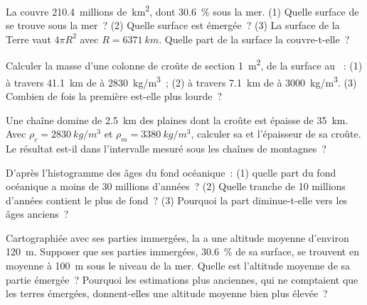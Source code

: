 \begin{exercise}[$\star\star$]\label{exo:g12:continental-crust:6}
La  couvre \num{210.4}~millions de~\unit{km^2}, dont
\qty{30.6}{\percent} sous la mer. (1) Quelle surface de 
se trouve sous la mer~? (2) Quelle surface est émergée~? (3) La surface de
la Terre vaut $4\pi R^2$ avec $R = \qty{6371}{km}$. Quelle part de la
surface la  couvre-t-elle~?
\end{exercise}

\begin{exercise}[$\star\star$]\label{exo:g12:continental-crust:7}
Calculer la masse d'une colonne de croûte de section \qty{1}{m^2}, de la
surface au ~: (1) à travers \qty{41.1}{km} de  à
\qty{2830}{kg/m^3}~; (2) à travers \qty{7.1}{km} de  à
\qty{3000}{kg/m^3}. (3) Combien de fois la première est-elle plus
lourde~?
\end{exercise}

\begin{exercise}[$\star\star$]\label{exo:g12:continental-crust:8}
Une chaîne domine de \qty{2.5}{km} des plaines dont la croûte est épaisse
de \qty{35}{km}. Avec $\rho_c = \qty{2830}{kg/m^3}$ et
$\rho_m =
\qty{3380}{kg/m^3}$, calculer sa  et l'épaisseur de sa
croûte. Le résultat est-il dans l'intervalle mesuré sous les chaînes de
montagnes~?
\end{exercise}

\begin{exercise}[$\star\star$]\label{exo:g12:continental-crust:9}
D'après l'histogramme des âges du fond océanique~: (1) quelle part du fond
océanique a moins de 30 millions d'années~? (2) Quelle tranche de 10
millions d'années contient le plus de fond~? (3) Pourquoi la part
diminue-t-elle vers les âges anciens~?
\end{exercise}

\begin{exercise}[$\star\star$]\label{exo:g12:continental-crust:10}
Cartographiée avec ses parties immergées, la  a une
altitude moyenne d'environ \qty{120}{m}. Supposer que ses parties
immergées, \qty{30.6}{\percent} de sa surface, se trouvent en moyenne à
\qty{100}{m} sous le niveau de la mer. Quelle est l'altitude moyenne de sa
partie émergée~? Pourquoi les estimations plus anciennes, qui ne comptaient
que les terres émergées, donnent-elles une altitude moyenne bien plus
élevée~?
\end{exercise}

